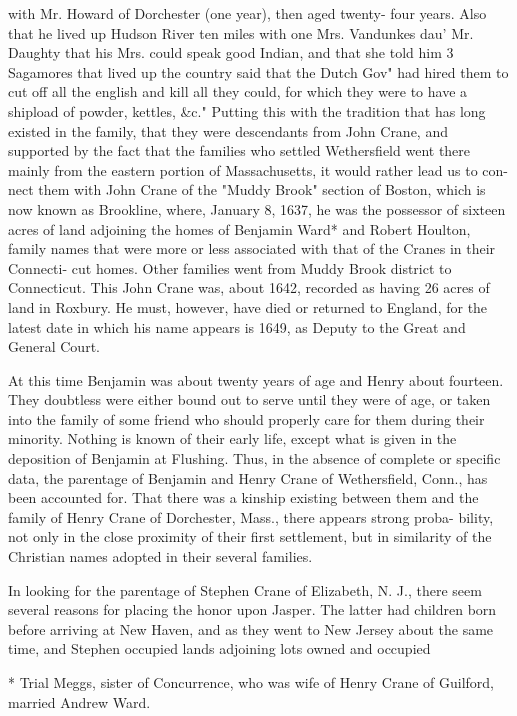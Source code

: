 \documentclass[oneside]{book}
\begin{document}
with Mr. Howard of Dorchester (one year), then aged twenty- 
four years. Also that he lived up Hudson River ten miles 
with one Mrs. Vandunkes dau' Mr. Daughty that his Mrs. 
could speak good Indian, and that she told him 3 Sagamores that 
lived up the country said that the Dutch Gov" had hired them to 
cut off all the english and kill all they could, for which they were 
to have a shipload of powder, kettles, \&c." Putting this with 
the tradition that has long existed in the family, that they were 
descendants from John Crane, and supported by the fact that 
the families who settled Wethersfield went there mainly from the 
eastern portion of Massachusetts, it would rather lead us to con- 
nect them with John Crane of the "Muddy Brook" section of 
Boston, which is now known as Brookline, where, January 8, 1637, 
he was the possessor of sixteen acres of land adjoining the homes 
of Benjamin Ward* and Robert Houlton, family names that were 
more or less associated with that of the Cranes in their Connecti- 
cut homes. Other families went from Muddy Brook district to 
Connecticut. This John Crane was, about 1642, recorded as 
having 26 acres of land in Roxbury. He must, however, have 
died or returned to England, for the latest date in which his name 
appears is 1649, as Deputy to the Great and General Court. 

At this time Benjamin was about twenty years of age and 
Henry about fourteen. They doubtless were either bound out to 
serve until they were of age, or taken into the family of some 
friend who should properly care for them during their minority. 
Nothing is known of their early life, except what is given in the 
deposition of Benjamin at Flushing. Thus, in the absence of 
complete or specific data, the parentage of Benjamin and Henry 
Crane of Wethersfield, Conn., has been accounted for. That 
there was a kinship existing between them and the family of 
Henry Crane of Dorchester, Mass., there appears strong proba- 
bility, not only in the close proximity of their first settlement, but 
in similarity of the Christian names adopted in their several 
families. 

In looking for the parentage of Stephen Crane of Elizabeth, 
N. J., there seem several reasons for placing the honor upon 
Jasper. The latter had children born before arriving at New 
Haven, and as they went to New Jersey about the same time, 
and Stephen occupied lands adjoining lots owned and occupied 

* Trial Meggs, sister of Concurrence, who was wife of Henry Crane 
of Guilford, married Andrew Ward. 
\end{document}
